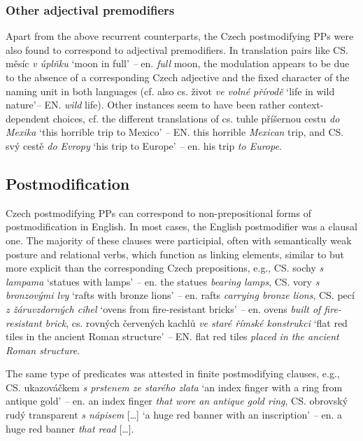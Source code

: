 \documentclass[output=paper]{langscibook}
\begin{document}
\subsubsection{Other adjectival premodifiers}

Apart from the above recurrent counterparts, the Czech postmodifying PPs were also found to correspond to adjectival premodifiers. In translation pairs like CS. měsíc \textit{v úplňku} ‘moon in full’ \textit{–} en. \textit{full} moon, the modulation appears to be due to the absence of a corresponding Czech adjective and the fixed character of the naming unit in both languages (cf. also cs. život \textit{ve volné přírodě} ‘life in wild nature’\textit{–} EN. \textit{wild} life). Other instances seem to have been rather context-dependent choices, cf. the different translations of cs. tuhle příšernou cestu \textit{do Mexika} ‘this horrible trip to Mexico’ \textit{–} EN. this horrible \textit{Mexican} trip, and CS. svý cestě \textit{do Evropy} ‘his trip to Europe’ \textit{–} en. his trip \textit{to Europe}.

\subsection{Postmodification}

Czech postmodifying PPs can correspond to non-prepositional forms of postmodification in English. In most cases, the English postmodifier was a clausal one. The majority of these clauses were participial, often with semantically weak posture and relational verbs, which function as linking elements, similar to but more explicit than the corresponding Czech prepositions, e.g., CS. sochy \textit{s lampama} ‘statues with lamps’ \textit{–} en. the statues \textit{bearing lamps}, CS. vory \textit{s bronzovými lvy} ‘rafts with bronze lions’ \textit{–} en. rafts \textit{carrying bronze lions}, CS. pecí \textit{z žáruvzdorných cihel} ‘ovens from fire-resistant bricks’ \textit{–} en. ovens \textit{built of fire-resistant brick}, cs. rovných červených kachlů \textit{ve staré římské konstrukci} ‘flat red tiles in the ancient Roman structure’ \textit{–} EN. flat red tiles \textit{placed in the ancient Roman structure}.

The same type of predicates was attested in finite postmodifying clauses, e.g., CS. ukazováčkem \textit{s prstenem ze starého zlata} ‘an index finger with a ring from antique gold’ \textit{–} en. an index finger \textit{that wore an antique gold ring}, CS. obrovský rudý transparent \textit{s nápisem} […] ‘a huge red banner with an inscription’ \textit{–} en. a huge red banner \textit{that read} […].
\end{document}
